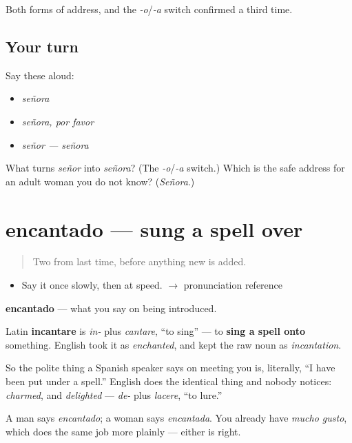 \begin{grammarlens}[title={What you've built}]
Both forms of address, and the \emph{-o}/\emph{-a} switch confirmed a third time.
\end{grammarlens}

\subsection*{Your turn}
Say these aloud:

\begin{itemize}
\raggedright
  \item \emph{señora}
  \item \emph{señora, por favor}
  \item \emph{señor — señora}
\end{itemize}

\begin{tcolorbox}[breakable,colback=teal!4,colframe=teal!35!black,title={Before you move on}]
What turns \emph{señor} into \emph{señora}? (The \emph{-o}/\emph{-a} switch.) Which is the safe address for an adult woman you do not know? (\emph{Señora}.)
\end{tcolorbox}
\section[encantado]{encantado — sung a spell over}

\label{lesson:ES-C305-encantado}



\begin{quote}
Two from last time, before anything new is added.
\end{quote}

\begin{sounds}
\begin{itemize}
\raggedright
  \item Say it once slowly, then at speed. $\to$ pronunciation reference
\end{itemize}
\end{sounds}

\begin{cousinweb}
\textbf{encantado} — what you say on being introduced.

Latin \textbf{incantare} is \emph{in-} plus \emph{cantare}, \textquotedblleft{}to sing\textquotedblright{} — to \textbf{sing a spell onto} something. English took it as \emph{enchanted}, and kept the raw noun as \emph{incantation}.

So the polite thing a Spanish speaker says on meeting you is, literally, \textquotedblleft{}I have been put under a spell.\textquotedblright{} English does the identical thing and nobody notices: \emph{charmed}, and \emph{delighted} — \emph{de-} plus \emph{lacere}, \textquotedblleft{}to lure.\textquotedblright{}

A man says \emph{encantado}; a woman says \emph{encantada}. You already have \emph{mucho gusto}, which does the same job more plainly — either is right.
\end{cousinweb}


